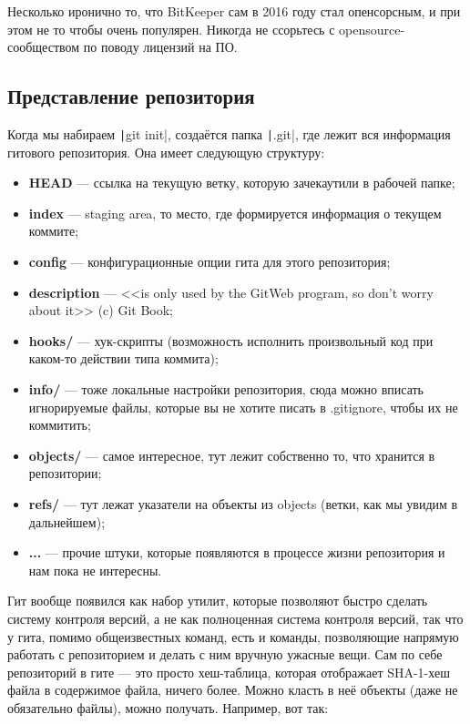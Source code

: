 \documentclass[a5paper]{article}
\begin{document}
Несколько иронично то, что BitKeeper сам в 2016 году стал опенсорсным, и при этом не то чтобы очень популярен. Никогда не ссорьтесь с opensource-сообществом по поводу лицензий на ПО.

\subsection{Представление репозитория}

Когда мы набираем \texttt|git init|, создаётся папка \texttt|.git|, где лежит вся информация гитового репозитория. Она имеет следующую структуру:

\begin{itemize}
    \item \textbf{HEAD} --- ссылка на текущую ветку, которую зачекаутили в рабочей папке;
    \item \textbf{index} --- staging area, то место, где формируется информация о текущем коммите;
    \item \textbf{config} --- конфигурационные опции гита для этого репозитория;
    \item \textbf{description} --- <<is only used by the GitWeb program, so don’t worry about it>> (c) Git Book;
    \item \textbf{hooks/} --- хук-скрипты (возможность исполнить произвольный код при каком-то действии типа коммита);
    \item \textbf{info/} --- тоже локальные настройки репозитория, сюда можно вписать игнорируемые файлы, которые вы не хотите писать в .gitignore, чтобы их не коммитить;
    \item \textbf{objects/} --- самое интересное, тут лежит собственно то, что хранится в репозитории;
    \item \textbf{refs/} --- тут лежат указатели на объекты из objects (ветки, как мы увидим в дальнейшем);
    \item \textbf{...} --- прочие штуки, которые появляются в процессе жизни репозитория и нам пока не интересны.
\end{itemize}

Гит вообще появился как набор утилит, которые позволяют быстро сделать систему контроля версий, а не как полноценная система контроля версий, так что у гита, помимо общеизвестных команд, есть и команды, позволяющие напрямую работать с репозиторием и делать с ним вручную ужасные вещи. Сам по себе репозиторий в гите --- это просто хеш-таблица, которая отображает SHA-1-хеш файла в содержимое файла, ничего более. Можно класть в неё объекты (даже не обязательно файлы), можно получать. Например, вот так:
\end{document}
